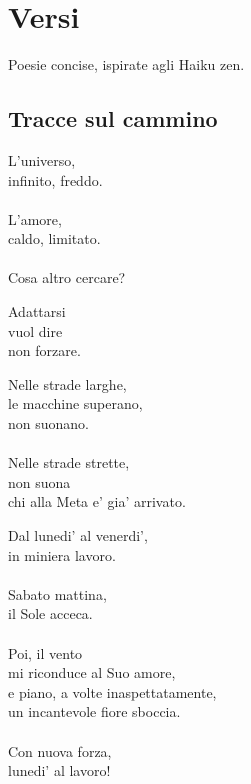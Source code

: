 \chapter{Versi}

Poesie concise, ispirate agli Haiku zen.\\

\vfill

\section{Tracce sul cammino}

\begin{haiku}
L'universo,\\
infinito, freddo.\\
\leavevmode\\
L'amore,\\
caldo, limitato.\\
\leavevmode\\
Cosa altro cercare?\\
\end{haiku}


\begin{haiku}
Adattarsi \\
vuol dire\\
non forzare.\\
\end{haiku}

\begin{haiku}
Nelle strade larghe,\\
le macchine superano,\\
non suonano.\\
\leavevmode\\
Nelle strade strette,\\
non suona\\
chi alla Meta e' gia' arrivato.\\
\end{haiku}

\begin{haiku}
Dal lunedi' al venerdi',\\
in miniera lavoro.\\
\leavevmode\\
Sabato mattina,\\
il Sole acceca.\\
\leavevmode\\
Poi, il vento\\
mi riconduce al Suo amore,\\
e piano, a volte inaspettatamente,\\
un incantevole fiore sboccia.\\
\leavevmode\\
Con nuova forza,\\
lunedi' al lavoro!\\
\end{haiku}

